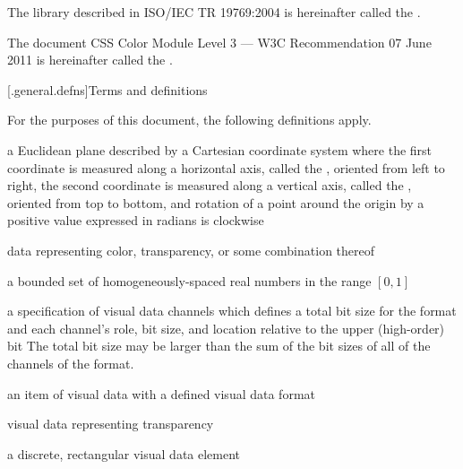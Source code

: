 \pnum
The library described in ISO/IEC TR 19769:2004 is hereinafter called the
.

\pnum
The document CSS Color Module Level 3 --- W3C Recommendation 07 June 2011 is 
hereinafter called the .

[\iotwod.general.defns]{Terms and definitions}

\pnum
{}
For the purposes of this document, the following definitions apply.

a Euclidean plane described by a Cartesian coordinate system where the first coordinate is measured along a horizontal axis, called the \xaxis, oriented from left to right, the second coordinate is measured along a vertical axis, called the \yaxis, oriented from top to bottom, and rotation of a point around the origin by a positive value expressed in radians is clockwise

data representing color, transparency, or some combination thereof

a bounded set of homogeneously-spaced real numbers in the range $[0,1]$

%
a specification of visual data channels which defines a total bit size for the format and each channel's role, bit size, and location relative to the upper (high-order) bit
\enternote
The total bit size may be larger than the sum of the bit sizes of all of the channels of the format.
\exitnote

an item of visual data with a defined visual data format

visual data representing transparency

a discrete, rectangular visual data element


